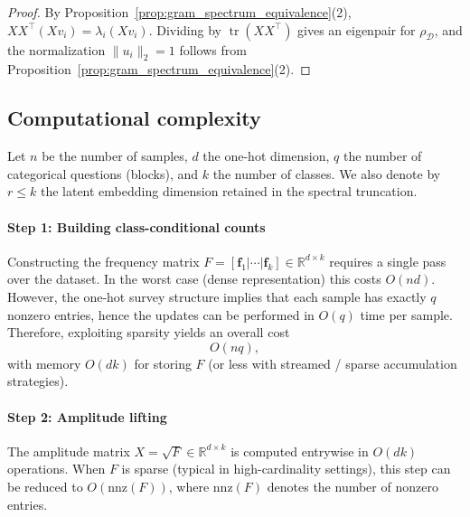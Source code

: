 \documentclass[preprint,11pt]{elsarticle}
\newcommand{\tr}{\operatorname{tr}}
\newcommand{\R}{\mathbb{R}}
\begin{document}
\begin{proof}
By Proposition~\ref{prop:gram_spectrum_equivalence}(2), $XX^\top(Xv_i)=\lambda_i(Xv_i)$.
Dividing by $\tr(XX^\top)$ gives an eigenpair for $\rho_{\mathcal D}$, and the normalization
$\|u_i\|_2=1$ follows from Proposition~\ref{prop:gram_spectrum_equivalence}(2).
\end{proof}

\subsection{Computational complexity}
\label{subsec:complexity}

Let $n$ be the number of samples, $d$ the one-hot dimension, $q$ the number of categorical questions (blocks),
and $k$ the number of classes. We also denote by $r\le k$ the latent embedding dimension retained in the spectral truncation.

\paragraph{Step 1: Building class-conditional counts}
Constructing the frequency matrix $F=[\mathbf f_1|\cdots|\mathbf f_k]\in\R^{d\times k}$ requires a single pass over the dataset.
In the worst case (dense representation) this costs $O(nd)$.
However, the one-hot survey structure implies that each sample has exactly $q$ nonzero entries, hence the updates can be performed
in $O(q)$ time per sample. Therefore, exploiting sparsity yields an overall cost
\[
O(nq),
\]
with memory $O(dk)$ for storing $F$ (or less with streamed / sparse accumulation strategies).

\paragraph{Step 2: Amplitude lifting}
The amplitude matrix $X=\sqrt{F}\in\R^{d\times k}$ is computed entrywise in $O(dk)$ operations.
When $F$ is sparse (typical in high-cardinality settings), this step can be reduced to $O(\mathrm{nnz}(F))$,
where $\mathrm{nnz}(F)$ denotes the number of nonzero entries.
\end{document}
